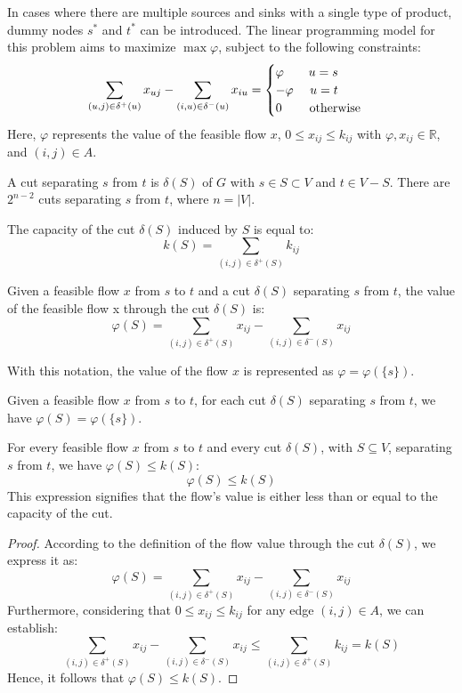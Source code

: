 In cases where there are multiple sources and sinks with a single type of product, dummy nodes $s^{*}$ and $t^{*}$ can be introduced. 
The linear programming model for this problem aims to maximize $\max \varphi$, subject to the following constraints:
\[\sum_{(u,j)\in \delta^{+}(u)}x_{uj}-\sum_{(i,u)\in \delta^{-}(u)}x_{iu}=
\begin{cases}
    \varphi \:\:\:\:\:\:\:\:\: u=s    \\
    -\varphi \:\:\:\:\:\: u=t   \\
    0 \:\:\:\:\:\:\:\:\:\: \textnormal{otherwise}
\end{cases}\]
Here, $\varphi$ represents the value of the feasible flow $x$, $0 \leq x_{ij} \leq k_{ij}$ with $\varphi,x_{ij} \in \mathbb{R}$, and $(i,j) \in A$.
\begin{definition}
    A cut separating $s$ from $t$ is $\delta(S)$ of $G$ with $s \in S \subset V$ and $t \in V-S$. There are $2^{n-2}$ cuts separating $s$ from $t$, where 
    $n=\left\lvert V \right\rvert$.
\end{definition}
\begin{definition}
    The capacity of the cut $\delta(S)$ induced by $S$ is equal to: 
    \[k(S)=\sum_{(i,j)\in \delta^{+}(S)}k_{ij}\]
\end{definition}
\begin{definition}
    Given a feasible flow $x$ from $s$ to $t$ and a cut $\delta(S)$ separating $s$ from $t$, the value of the feasible flow x through the cut $\delta(S)$ is: 
    \[\varphi(S)=\sum_{(i,j)\in \delta^{+}(S)}x_{ij} - \sum_{(i,j)\in \delta^{-}(S)}x_{ij}\]
\end{definition}
With this notation, the value of the flow $x$ is represented as $\varphi = \varphi(\{s\})$. 
\begin{property}
    Given a feasible flow $x$ from $s$ to $t$, for each cut $\delta(S)$ separating $s$ from $t$, we have $\varphi(S)=\varphi(\{s\})$.
\end{property}
\begin{property}
    For every feasible flow $x$ from $s$ to $t$ and every cut $\delta(S)$, with $S \subseteq V$, separating $s$ from $t$, we have $\varphi(S) \leq k(S)$:
    \[\varphi(S) \leq k(S)\]
    This expression signifies that the flow's value is either less than or equal to the capacity of the cut.
\end{property}
\begin{proof}
    According to the definition of the flow value through the cut $\delta(S)$, we express it as:
    \[\varphi(S)=\sum_{(i,j) \in \delta^{+}(S)}x_{ij}-\sum_{(i,j) \in \delta^{-}(S)}x_{ij}\]
    Furthermore, considering that $0 \leq x_{ij } \leq k_{ij}$ for any edge $(i, j) \in A$, we can establish:
    \[\sum_{(i,j) \in \delta^{+}(S)}x_{ij}-\sum_{(i,j) \in \delta^{-}(S)}x_{ij} \leq \sum_{(i,j) \in \delta^{+}(S)}k_{ij}=k(S)\]
    Hence, it follows that $\varphi(S) \leq k(S)$.
\end{proof}

